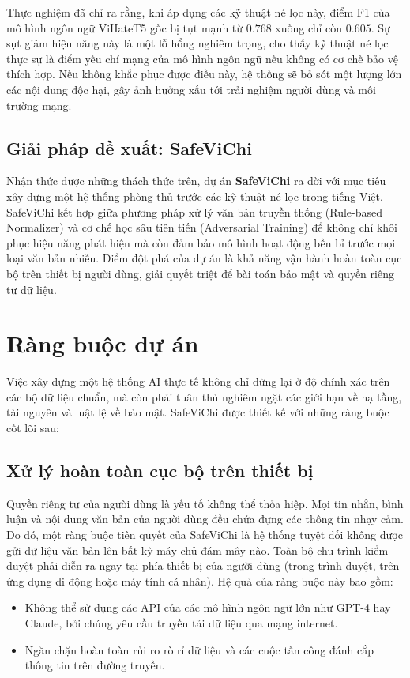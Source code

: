 \documentclass[12pt,a4paper]{article}
\begin{document}
Thực nghiệm đã chỉ ra rằng, khi áp dụng các kỹ thuật né lọc này, điểm F1 của mô hình ngôn ngữ ViHateT5 gốc bị tụt mạnh từ $0.768$ xuống chỉ còn $0.605$. Sự sụt giảm hiệu năng này là một lỗ hổng nghiêm trọng, cho thấy kỹ thuật né lọc thực sự là điểm yếu chí mạng của mô hình ngôn ngữ nếu không có cơ chế bảo vệ thích hợp. Nếu không khắc phục được điều này, hệ thống sẽ bỏ sót một lượng lớn các nội dung độc hại, gây ảnh hưởng xấu tới trải nghiệm người dùng và môi trường mạng.

\subsection{Giải pháp đề xuất: SafeViChi}
Nhận thức được những thách thức trên, dự án \textbf{SafeViChi} ra đời với mục tiêu xây dựng một hệ thống phòng thủ trước các kỹ thuật né lọc trong tiếng Việt. SafeViChi kết hợp giữa phương pháp xử lý văn bản truyền thống (Rule-based Normalizer) và cơ chế học sâu tiên tiến (Adversarial Training) để không chỉ khôi phục hiệu năng phát hiện mà còn đảm bảo mô hình hoạt động bền bỉ trước mọi loại văn bản nhiễu. Điểm đột phá của dự án là khả năng vận hành hoàn toàn cục bộ trên thiết bị người dùng, giải quyết triệt để bài toán bảo mật và quyền riêng tư dữ liệu.

\newpage
\section{Ràng buộc dự án}
Việc xây dựng một hệ thống AI thực tế không chỉ dừng lại ở độ chính xác trên các bộ dữ liệu chuẩn, mà còn phải tuân thủ nghiêm ngặt các giới hạn về hạ tầng, tài nguyên và luật lệ về bảo mật. SafeViChi được thiết kế với những ràng buộc cốt lõi sau:

\subsection{Xử lý hoàn toàn cục bộ trên thiết bị}
Quyền riêng tư của người dùng là yếu tố không thể thỏa hiệp. Mọi tin nhắn, bình luận và nội dung văn bản của người dùng đều chứa đựng các thông tin nhạy cảm. Do đó, một ràng buộc tiên quyết của SafeViChi là hệ thống tuyệt đối không được gửi dữ liệu văn bản lên bất kỳ máy chủ đám mây nào. Toàn bộ chu trình kiểm duyệt phải diễn ra ngay tại phía thiết bị của người dùng (trong trình duyệt, trên ứng dụng di động hoặc máy tính cá nhân).
Hệ quả của ràng buộc này bao gồm:
\begin{itemize}
    \item Không thể sử dụng các API của các mô hình ngôn ngữ lớn như GPT-4 hay Claude, bởi chúng yêu cầu truyền tải dữ liệu qua mạng internet.
    \item Ngăn chặn hoàn toàn rủi ro rò rỉ dữ liệu và các cuộc tấn công đánh cắp thông tin trên đường truyền.
\end{itemize}
\end{document}
